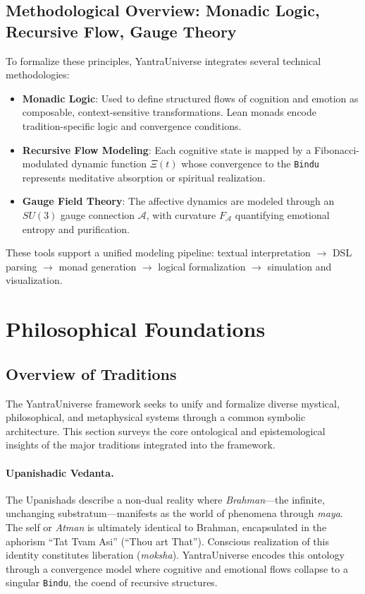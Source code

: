 \documentclass[12pt]{article}
\theoremstyle{plain}
\begin{document}
\subsection{Methodological Overview: Monadic Logic, Recursive Flow, Gauge Theory}

To formalize these principles, YantraUniverse integrates several technical methodologies:

\begin{itemize}
    \item \textbf{Monadic Logic}: Used to define structured flows of cognition and emotion as composable, context-sensitive transformations. Lean monads encode tradition-specific logic and convergence conditions.
    \item \textbf{Recursive Flow Modeling}: Each cognitive state is mapped by a Fibonacci-modulated dynamic function $\Xi(t)$ whose convergence to the \texttt{Bindu} represents meditative absorption or spiritual realization.
    \item \textbf{Gauge Field Theory}: The affective dynamics are modeled through an $SU(3)$ gauge connection $\mathcal{A}$, with curvature $F_{\mathcal{A}}$ quantifying emotional entropy and purification.
\end{itemize}

These tools support a unified modeling pipeline: textual interpretation $\rightarrow$ DSL parsing $\rightarrow$ monad generation $\rightarrow$ logical formalization $\rightarrow$ simulation and visualization.

\section{Philosophical Foundations}
\subsection{Overview of Traditions}

The YantraUniverse framework seeks to unify and formalize diverse mystical, philosophical, and metaphysical systems through a common symbolic architecture. This section surveys the core ontological and epistemological insights of the major traditions integrated into the framework.

\paragraph{Upanishadic Vedanta.}
The Upanishads describe a non-dual reality where \textit{Brahman}—the infinite, unchanging substratum—manifests as the world of phenomena through \textit{maya}. The self or \textit{Atman} is ultimately identical to Brahman, encapsulated in the aphorism “Tat Tvam Asi” (“Thou art That”). Conscious realization of this identity constitutes liberation (\textit{moksha}). YantraUniverse encodes this ontology through a convergence model where cognitive and emotional flows collapse to a singular \texttt{Bindu}, the coend of recursive structures.
\end{document}
